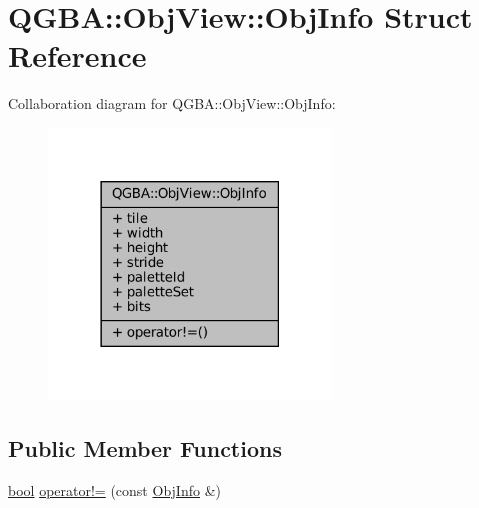 \hypertarget{struct_q_g_b_a_1_1_obj_view_1_1_obj_info}{}\section{Q\+G\+BA\+:\+:Obj\+View\+:\+:Obj\+Info Struct Reference}
\label{struct_q_g_b_a_1_1_obj_view_1_1_obj_info}


Collaboration diagram for Q\+G\+BA\+:\+:Obj\+View\+:\+:Obj\+Info\+:
\nopagebreak
\begin{figure}[H]
\begin{center}
\leavevmode
\includegraphics[width=213pt]{struct_q_g_b_a_1_1_obj_view_1_1_obj_info__coll__graph}
\end{center}
\end{figure}
\subsection*{Public Member Functions}
\begin{DoxyCompactItemize}
\item 
\mbox{\hyperlink{libretro_8h_a4a26dcae73fb7e1528214a068aca317e}{bool}} \mbox{\hyperlink{struct_q_g_b_a_1_1_obj_view_1_1_obj_info_a28af078c745cff5f913d3c8e8c83e5ed}{operator!=}} (const \mbox{\hyperlink{struct_q_g_b_a_1_1_obj_view_1_1_obj_info}{Obj\+Info}} \&)
\end{DoxyCompactItemize}
